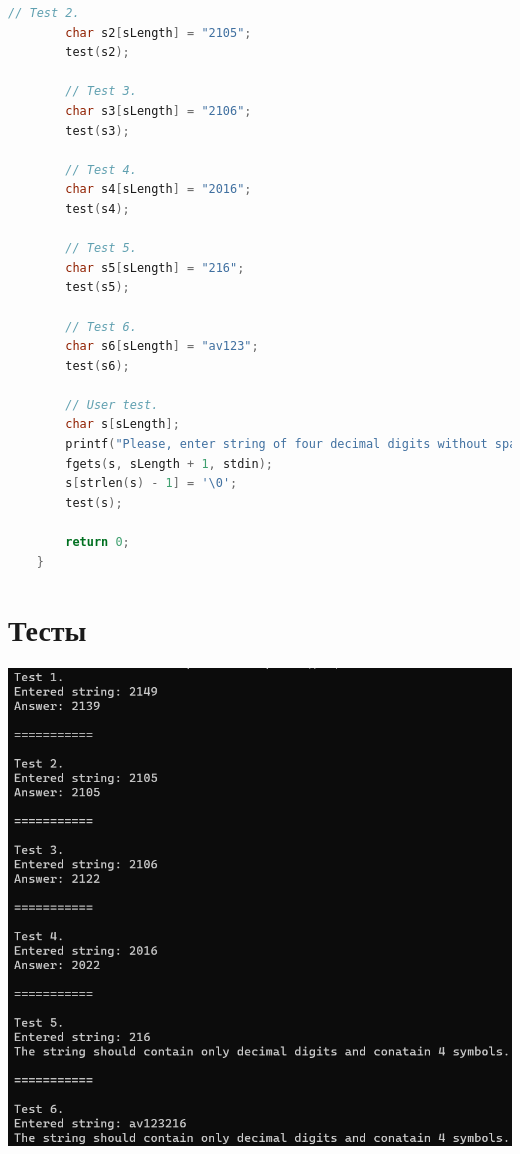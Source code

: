 \documentclass[12pt]{article}
\begin{document}
\begin{lstlisting}[language=C]
		// Test 2.
		char s2[sLength] = "2105";
		test(s2);
		
		// Test 3.
		char s3[sLength] = "2106";
		test(s3);
		
		// Test 4.
		char s4[sLength] = "2016";
		test(s4);
		
		// Test 5.
		char s5[sLength] = "216";
		test(s5);
		
		// Test 6.
		char s6[sLength] = "av123";
		test(s6);
		
		// User test.
		char s[sLength];
		printf("Please, enter string of four decimal digits without spaces: ");
		fgets(s, sLength + 1, stdin);
		s[strlen(s) - 1] = '\0';
		test(s);
		
		return 0;
	}
	\end{lstlisting}
	
	\newpage
	
	
	\section*{Тесты}
	
	\includegraphics[width=400pt]{tests.png}
	
\end{document}

